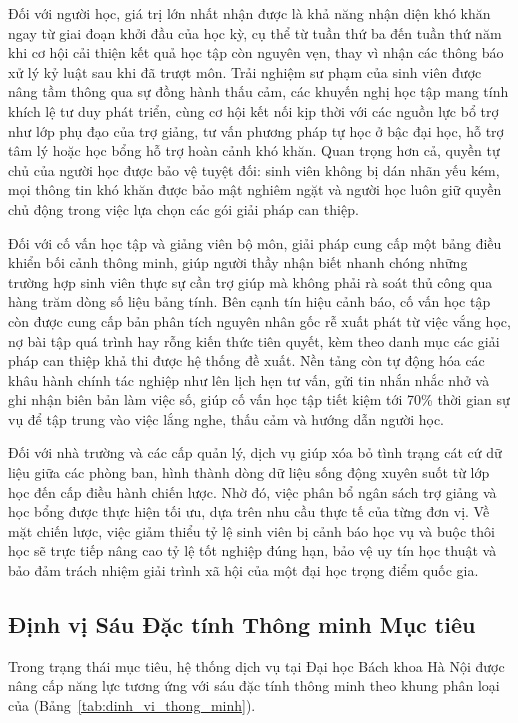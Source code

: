 Đối với người học, giá trị lớn nhất nhận được là khả năng nhận diện khó khăn ngay từ giai đoạn khởi đầu của học kỳ, cụ thể từ tuần thứ ba đến tuần thứ năm khi cơ hội cải thiện kết quả học tập còn nguyên vẹn, thay vì nhận các thông báo xử lý kỷ luật sau khi đã trượt môn. Trải nghiệm sư phạm của sinh viên được nâng tầm thông qua sự đồng hành thấu cảm, các khuyến nghị học tập mang tính khích lệ tư duy phát triển, cùng cơ hội kết nối kịp thời với các nguồn lực bổ trợ như lớp phụ đạo của trợ giảng, tư vấn phương pháp tự học ở bậc đại học, hỗ trợ tâm lý hoặc học bổng hỗ trợ hoàn cảnh khó khăn. Quan trọng hơn cả, quyền tự chủ của người học được bảo vệ tuyệt đối: sinh viên không bị dán nhãn yếu kém, mọi thông tin khó khăn được bảo mật nghiêm ngặt và người học luôn giữ quyền chủ động trong việc lựa chọn các gói giải pháp can thiệp.

Đối với cố vấn học tập và giảng viên bộ môn, giải pháp cung cấp một bảng điều khiển bối cảnh thông minh, giúp người thầy nhận biết nhanh chóng những trường hợp sinh viên thực sự cần trợ giúp mà không phải rà soát thủ công qua hàng trăm dòng số liệu bảng tính. Bên cạnh tín hiệu cảnh báo, cố vấn học tập còn được cung cấp bản phân tích nguyên nhân gốc rễ xuất phát từ việc vắng học, nợ bài tập quá trình hay rỗng kiến thức tiên quyết, kèm theo danh mục các giải pháp can thiệp khả thi được hệ thống đề xuất. Nền tảng còn tự động hóa các khâu hành chính tác nghiệp như lên lịch hẹn tư vấn, gửi tin nhắn nhắc nhở và ghi nhận biên bản làm việc số, giúp cố vấn học tập tiết kiệm tới 70\% thời gian sự vụ để tập trung vào việc lắng nghe, thấu cảm và hướng dẫn người học.

Đối với nhà trường và các cấp quản lý, dịch vụ giúp xóa bỏ tình trạng cát cứ dữ liệu giữa các phòng ban, hình thành dòng dữ liệu sống động xuyên suốt từ lớp học đến cấp điều hành chiến lược. Nhờ đó, việc phân bổ ngân sách trợ giảng và học bổng được thực hiện tối ưu, dựa trên nhu cầu thực tế của từng đơn vị. Về mặt chiến lược, việc giảm thiểu tỷ lệ sinh viên bị cảnh báo học vụ và buộc thôi học sẽ trực tiếp nâng cao tỷ lệ tốt nghiệp đúng hạn, bảo vệ uy tín học thuật và bảo đảm trách nhiệm giải trình xã hội của một đại học trọng điểm quốc gia.

\subsection{Định vị Sáu Đặc tính Thông minh Mục tiêu}
Trong trạng thái mục tiêu, hệ thống dịch vụ tại Đại học Bách khoa Hà Nội được nâng cấp năng lực tương ứng với sáu đặc tính thông minh theo khung phân loại của \citet{uskov2018} (Bảng~\ref{tab:dinh_vi_thong_minh}).

